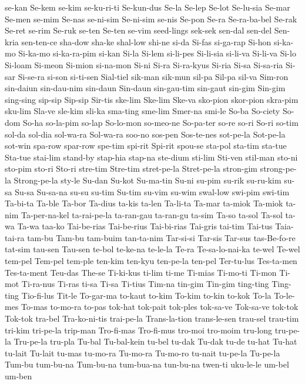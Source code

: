 {se-kan
Se-kem
se-kim
se-ku-ri-ti
Se-kun-dus
Se-la
Se-lep
Se-lot
Se-lu-sia
Se-mar
Se-men
se-mim
Se-nas
se-ni-sim
Se-ni-sim
se-nis
Se-pon
Se-ra
Se-ra-ba-bel
Se-rak
Se-ret
se-rim
Se-ruk
se-ten
Se-ten
se-vim
seed-lings
sek-sek
sen-dal
sen-del
Sen-kria
sen-ten-ce
sha-dow
sha-ke
shal-low
shi-ne
si-da
Si-fas
si-ga-rap
Si-hon
si-ka-mo
Si-ka-mo
si-ka-ra-pim
si-kan
Si-la
Si-lem
si-li-pes
Si-li-sia
si-li-va
Si-li-va
Si-lo
Si-loam
Si-meon
Si-mion
si-na-mon
Si-ni
Si-ra
Si-ra-kyus
Si-ria
Si-sa
Si-sa-ria
Si-sar
Si-se-ra
si-son
si-ti-sen
Sial-tiel
sik-man
sik-mun
sil-pa
Sil-pa
sil-va
Sim-ron
sin-daiun
sin-dau-nim
sin-daun
Sin-daun
sin-gau-tim
sin-gaut
sin-gim
Sin-gim
sing-sing
sip-sip
Sip-sip
Sir-tis
ske-lim
Ske-lim
Ske-va
sko-pion
skor-pion
skra-pim
sku-lim
Sla-ve
sle-kim
sli-ka
sma-ting
sme-lim
Smer-na
smi-le
So-ba
So-ciety
So-dom
So-ha
so-la-pim
so-lap
So-lo-mon
so-meo-ne
So-pa-ter
so-re
so-ri
So-ri
so-tim
sol-da
sol-dia
sol-wa-ra
Sol-wa-ra
soo-no
sos-pen
Sos-te-nes
sot-pe-la
Sot-pe-la
sot-win
spa-row
spar-row
spe-tim
spi-rit
Spi-rit
spou-se
sta-pol
sta-tim
sta-tue
Sta-tue
stai-lim
stand-by
stap-hia
stap-na
ste-dium
sti-lim
Sti-ven
stil-man
sto-ni
sto-pim
sto-ri
Sto-ri
stre-tim
Stre-tim
stret-pe-la
Stret-pe-la
stron-gim
strong-pe-la
Strong-pe-la
sty-le
Su-dan
Su-kot
Su-ma-tin
Su-ni
su-pim
su-rik
su-ru-kim
su-sa
Su-sa
Su-sa-na
su-su
su-tim
Su-tim
su-vim
su-wim
swal-low
swi-pim
swi-tim
Ta-bi-ta
Ta-ble
Ta-bor
Ta-dius
ta-kis
ta-len
Ta-li-ta
Ta-mar
ta-miok
Ta-miok
ta-nim
Ta-per-na-kel
ta-rai-pe-la
ta-ran-gau
ta-ran-gu
ta-sim
Ta-so
ta-sol
Ta-sol
ta-wa
Ta-wa
taa-ko
Tai-be-rias
Tai-be-rius
Tai-bi-rias
Tai-gris
tai-tim
Tai-tus
Taia-tai-ra
tam-bu
Tam-bu
tam-buim
tan-ta-nim
Tar-si-si
Tar-sis
Tar-sus
tas-Be-fo-re
tat-sim
tau-sen
Tau-sen
te-bol
te-ke-na
te-le-la
Te-ra
Te-sa-lo-nai-ka
te-wel
Te-wel
tem-pel
Tem-pel
tem-ple
ten-kim
ten-kyu
ten-pe-la
ten-pel
Ter-tu-lus
Tes-ta-men
Tes-ta-ment
Teu-das
The-se
Ti-ki-kus
ti-lim
ti-me
Ti-mias
Ti-mo-ti
Ti-mon
Ti-mot
Ti-ra-nus
Ti-ras
ti-sa
Ti-sa
Ti-tius
Tim-na
tin-gim
Tin-gim
ting-ting
Ting-ting
Tio-fi-lus
Tit-le
To-gar-ma
to-kaut
to-kim
To-kim
to-kin
to-kok
To-la
To-le-mes
To-mas
to-mo-ra
to-pas
tok-hat
tok-pait
tok-ples
tok-sa-ve
Tok-sa-ve
tok-tok
Tok-tok
tra-bel
Tra-ko-ni-tis
trai-pe-la
Trans-la-tion
trans-le-sen
trau-sel
trau-tim
tri-kim
tri-pe-la
trip-man
Tro-fi-mas
Tro-fi-mus
tro-moi
tro-moim
tru-long
tru-pe-la
Tru-pe-la
tru-pla
Tu-bal
Tu-bal-kein
tu-bel
tu-dak
Tu-dak
tu-de
tu-hat
Tu-hat
tu-lait
Tu-lait
tu-mas
tu-mo-ra
Tu-mo-ra
Tu-mo-ro
tu-nait
tu-pe-la
Tu-pe-la
Tum-bu
tum-bu-na
Tum-bu-na
tum-bua-na
tun-bu-na
twen-ti
uku-le-le
um-bel
um-ben
}
